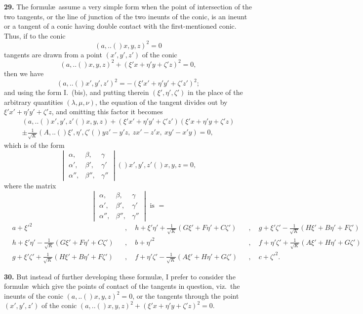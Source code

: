 \documentclass[11pt,a4paper]{book}
\providecommand{\qform}[1]{(#1)}
\begin{document}
\textbf{29.} The formul\ae\ assume a very simple form when the point of intersection of the two tangents, or the line of junction of the two ineunts of the conic, is an ineunt or a tangent of a conic having double contact with the first-mentioned conic. Thus, if to the conic
\[
(a,..\!\qform{}{x, y, z})^{2} = 0
\]
tangents are drawn from a point $(x', y', z')$ of the conic
\[
(a,..\!\qform{}{x, y, z})^{2} + (\xi'x + \eta'y + \zeta'z)^{2} = 0,
\]
then we have
\[
(a,..\!\qform{}{x', y', z'})^{2} = -(\xi'x' + \eta'y' + \zeta'z')^{2};
\]
and using the form I.\ (bis), and putting therein $(\xi', \eta', \zeta')$ in the place of the arbitrary quantities $(\lambda, \mu, \nu)$, the equation of the tangent divides out by $\xi'x' + \eta'y' + \zeta'z$, and omitting this factor it becomes
\begin{multline*}
(a,..\!\qform{}{x', y', z'}\!\qform{}{x, y, z}) + (\xi'x' + \eta'y' + \zeta'z')(\xi'x + \eta'y + \zeta'z)\\
\pm \frac{1}{\sqrt{K}}(A,..\!\qform{}{\xi', \eta', \zeta'}\!\qform{}{yz' - y'z,\ zx' - z'x,\ xy' - x'y}) = 0,
\end{multline*}
which is of the form
\[
\begin{vmatrix}
\alpha, & \beta, & \gamma \\
\alpha', & \beta', & \gamma' \\
\alpha'', & \beta'', & \gamma''
\end{vmatrix}
\!\qform{}{x', y', z'}\!\qform{}{x, y, z} = 0,
\]
where the matrix
\[
\begin{vmatrix}
\alpha, & \beta, & \gamma \\
\alpha', & \beta', & \gamma' \\
\alpha'', & \beta'', & \gamma''
\end{vmatrix}
\text{ is } =
\]
\begin{align*}
&a + \xi'^{2} &&,\quad h + \xi'\eta' + \tfrac{1}{\sqrt{K}}(G\xi' + F\eta' + C\zeta') &&,\quad g + \xi'\zeta' - \tfrac{1}{\sqrt{K}}(H\xi' + B\eta' + F\zeta')\\
&h + \xi'\eta' - \tfrac{1}{\sqrt{K}}(G\xi' + F\eta' + C\zeta') &&,\quad b + \eta'^{2} &&,\quad f + \eta'\zeta' + \tfrac{1}{\sqrt{K}}(A\xi' + H\eta' + G\zeta')\\
&g + \xi'\zeta' + \tfrac{1}{\sqrt{K}}(H\xi' + B\eta' + F\zeta') &&,\quad f + \eta'\zeta' - \tfrac{1}{\sqrt{K}}(A\xi' + H\eta' + G\zeta') &&,\quad c + \zeta'^{2}.
\end{align*}

\textbf{30.} But instead of further developing these formul\ae, I prefer to consider the formul\ae\ which give the points of contact of the tangents in question, viz.\ the ineunts of the conic $(a,..\!\qform{}{x, y, z})^{2} = 0$, or the tangents through the point $(x', y', z')$ of the conic $(a,..\!\qform{}{x, y, z})^{2} + (\xi'x + \eta'y + \zeta'z)^{2} = 0$.
\end{document}
